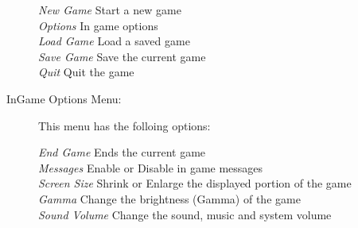 \begin{description}
  \emph{New Game } Start a new game\\
  \emph{Options } In game options\\
  \emph{Load Game } Load a saved game\\
  \emph{Save Game } Save the current game\\
  \emph{Quit } Quit the game%

  \item[InGame Options Menu: ]This menu has the folloing options:
  
  \emph{End Game } Ends the current game\\
  \emph{Messages }  Enable or Disable in game messages\\
  \emph{Screen Size } Shrink or Enlarge the displayed portion of the game\\
  \emph{Gamma } Change the brightness (Gamma) of the game\\
  \emph{Sound Volume } Change the sound, music and system volume%

\end{description}

